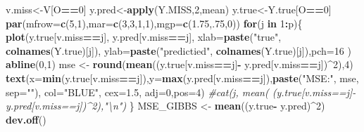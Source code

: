 \documentclass[12pt]{article}
\newenvironment{Shaded}{\begin{snugshade}}{\end{snugshade}}
\newcommand{\AttributeTok}[1]{\textcolor[rgb]{0.13,0.29,0.53}{#1}}
\newcommand{\CommentTok}[1]{\textcolor[rgb]{0.56,0.35,0.01}{\textit{#1}}}
\newcommand{\ControlFlowTok}[1]{\textcolor[rgb]{0.13,0.29,0.53}{\textbf{#1}}}
\newcommand{\DecValTok}[1]{\textcolor[rgb]{0.00,0.00,0.81}{#1}}
\newcommand{\FloatTok}[1]{\textcolor[rgb]{0.00,0.00,0.81}{#1}}
\newcommand{\FunctionTok}[1]{\textcolor[rgb]{0.13,0.29,0.53}{\textbf{#1}}}
\newcommand{\NormalTok}[1]{#1}
\newcommand{\OtherTok}[1]{\textcolor[rgb]{0.56,0.35,0.01}{#1}}
\newcommand{\SpecialCharTok}[1]{\textcolor[rgb]{0.81,0.36,0.00}{\textbf{#1}}}
\newcommand{\StringTok}[1]{\textcolor[rgb]{0.31,0.60,0.02}{#1}}
\begin{document}
\begin{Shaded}
\begin{Highlighting}[]
\NormalTok{v.miss}\OtherTok{\textless{}{-}}\NormalTok{V[O}\SpecialCharTok{==}\DecValTok{0}\NormalTok{]}
\NormalTok{y.pred}\OtherTok{\textless{}{-}}\FunctionTok{apply}\NormalTok{(Y.MISS,}\DecValTok{2}\NormalTok{,mean)}
\NormalTok{y.true}\OtherTok{\textless{}{-}}\NormalTok{Y.true[O}\SpecialCharTok{==}\DecValTok{0}\NormalTok{]}
\FunctionTok{par}\NormalTok{(}\AttributeTok{mfrow=}\FunctionTok{c}\NormalTok{(}\DecValTok{5}\NormalTok{,}\DecValTok{1}\NormalTok{),}\AttributeTok{mar=}\FunctionTok{c}\NormalTok{(}\DecValTok{3}\NormalTok{,}\DecValTok{3}\NormalTok{,}\DecValTok{1}\NormalTok{,}\DecValTok{1}\NormalTok{),}\AttributeTok{mgp=}\FunctionTok{c}\NormalTok{(}\FloatTok{1.75}\NormalTok{,.}\DecValTok{75}\NormalTok{,}\DecValTok{0}\NormalTok{))}
\ControlFlowTok{for}\NormalTok{(j }\ControlFlowTok{in} \DecValTok{1}\SpecialCharTok{:}\NormalTok{p)\{ }\FunctionTok{plot}\NormalTok{(y.true[v.miss}\SpecialCharTok{==}\NormalTok{j], y.pred[v.miss}\SpecialCharTok{==}\NormalTok{j], }
          \AttributeTok{xlab=}\FunctionTok{paste}\NormalTok{(}\StringTok{"true"}\NormalTok{, }\FunctionTok{colnames}\NormalTok{(Y.true)[j]), }
          \AttributeTok{ylab=}\FunctionTok{paste}\NormalTok{(}\StringTok{"predictied"}\NormalTok{, }\FunctionTok{colnames}\NormalTok{(Y.true)[j]),}\AttributeTok{pch=}\DecValTok{16}\NormalTok{ )}
          \FunctionTok{abline}\NormalTok{(}\DecValTok{0}\NormalTok{,}\DecValTok{1}\NormalTok{)}
\NormalTok{mse }\OtherTok{\textless{}{-}} \FunctionTok{round}\NormalTok{(}\FunctionTok{mean}\NormalTok{((y.true[v.miss}\SpecialCharTok{==}\NormalTok{j]}\SpecialCharTok{{-}}\NormalTok{ y.pred[v.miss}\SpecialCharTok{==}\NormalTok{j])}\SpecialCharTok{\^{}}\DecValTok{2}\NormalTok{),}\DecValTok{4}\NormalTok{)}
\FunctionTok{text}\NormalTok{(}\AttributeTok{x=}\FunctionTok{min}\NormalTok{(y.true[v.miss}\SpecialCharTok{==}\NormalTok{j]),}\AttributeTok{y=}\FunctionTok{max}\NormalTok{(y.pred[v.miss}\SpecialCharTok{==}\NormalTok{j]),}\FunctionTok{paste}\NormalTok{(}\StringTok{"MSE:"}\NormalTok{, mse, }\AttributeTok{sep=}\StringTok{""}\NormalTok{), }
     \AttributeTok{col=}\StringTok{"BLUE"}\NormalTok{, }\AttributeTok{cex=}\FloatTok{1.5}\NormalTok{, }\AttributeTok{adj=}\DecValTok{0}\NormalTok{,}\AttributeTok{pos=}\DecValTok{4}\NormalTok{)}
\CommentTok{\#cat(j, mean( (y.true[v.miss==j]{-} y.pred[v.miss==j])\^{}2),"\textbackslash{}n") }
\NormalTok{\}}
\NormalTok{MSE\_GIBBS }\OtherTok{\textless{}{-}} \FunctionTok{mean}\NormalTok{((y.true}\SpecialCharTok{{-}}\NormalTok{ y.pred)}\SpecialCharTok{\^{}}\DecValTok{2}\NormalTok{)}
\FunctionTok{dev.off}\NormalTok{()}
\end{Highlighting}
\end{Shaded}
\end{document}

